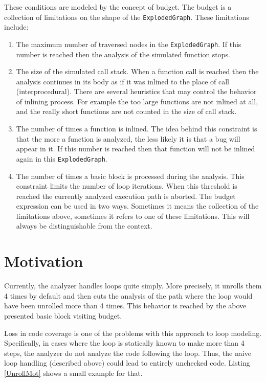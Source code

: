 \documentclass[oneside, a4paper, 12pt]{article}
\theoremstyle{definition}
\begin{document}
These conditions are modeled by the concept of budget.
The budget is a collection of limitations on the shape of the \texttt{ExplodedGraph}.
These limitations include:
\begin{enumerate}  
	\item The maximum number of traversed nodes in the \texttt{ExplodedGraph}. 
	If 	this number is reached then the analysis of the simulated function stops.
	\item The size of the simulated call stack. When a function call is 
	reached then the analysis continues in its body as if it was inlined to the 
	place of call (interprocedural). There are several heuristics that may control 
	the	behavior of inlining process. For example the too large functions are 
	not	inlined at all, and the really short functions are not counted in the 
	size of	call stack.
	\item The number of times a function is inlined. The idea behind this
	constraint is that the more a function is analyzed, the less likely it 
	is that a 	bug will appear in it. If this number is reached then that 
	function will not be inlined again in this \texttt{ExplodedGraph}.
	\item The number of times a basic block is processed during the 
	analysis. This	constraint limits the number of loop iterations. When this 
	threshold is reached the currently analyzed execution path is aborted.
	The budget expression can be used in two ways. Sometimes it means the
	collection of the limitations above, sometimes it refers to one of these
	limitations. This will always be distinguishable from the context.
\end{enumerate}


\section{Motivation}
Currently, the analyzer handles loops quite simply. More precisely, it unrolls 
them 4 times by default and then cuts the analysis of the path where the loop 
would have been unrolled more than 4 times. This behavior is reached by the 
above presented basic block visiting budget.

Loss in code coverage is one of the problems with this approach to loop
modeling. Specifically, in cases where the loop is statically known to make 
more than 4 steps, the analyzer do not analyze the code following the loop. 
Thus, the naive loop handling (described above) could lead to entirely 
unchecked code.
Listing \ref{UnrollMot} shows a small example for that.
\end{document}
